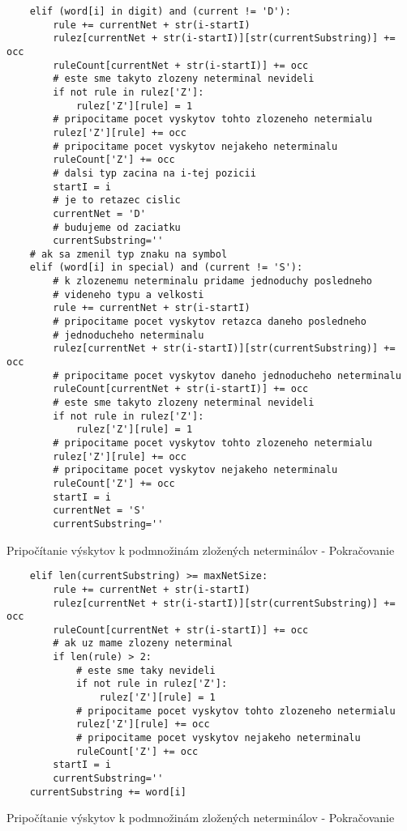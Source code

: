 \begin{listing}
\begin{verbatim}
	elif (word[i] in digit) and (current != 'D'):
		rule += currentNet + str(i-startI)
		rulez[currentNet + str(i-startI)][str(currentSubstring)] += occ
		ruleCount[currentNet + str(i-startI)] += occ
		# este sme takyto zlozeny neterminal nevideli
		if not rule in rulez['Z']:
			rulez['Z'][rule] = 1
		# pripocitame pocet vyskytov tohto zlozeneho netermialu
		rulez['Z'][rule] += occ
		# pripocitame pocet vyskytov nejakeho neterminalu
		ruleCount['Z'] += occ
		# dalsi typ zacina na i-tej pozicii
		startI = i
		# je to retazec cislic
		currentNet = 'D'
		# budujeme od zaciatku
		currentSubstring=''
	# ak sa zmenil typ znaku na symbol
	elif (word[i] in special) and (current != 'S'):
		# k zlozenemu neterminalu pridame jednoduchy posledneho
		# videneho typu a velkosti
		rule += currentNet + str(i-startI)
		# pripocitame pocet vyskytov retazca daneho posledneho
		# jednoducheho neterminalu
		rulez[currentNet + str(i-startI)][str(currentSubstring)] += occ
		# pripocitame pocet vyskytov daneho jednoducheho neterminalu
		ruleCount[currentNet + str(i-startI)] += occ
		# este sme takyto zlozeny neterminal nevideli
		if not rule in rulez['Z']:
			rulez['Z'][rule] = 1
		# pripocitame pocet vyskytov tohto zlozeneho netermialu
		rulez['Z'][rule] += occ
		# pripocitame pocet vyskytov nejakeho neterminalu
		ruleCount['Z'] += occ
		startI = i
		currentNet = 'S'
		currentSubstring=''
\end{verbatim}
\caption{Pripočítanie výskytov k podmnožinám zložených neterminálov - Pokračovanie}
\label{lst:grammar2-2}
\end{listing}
\begin{listing}
\begin{verbatim}
	elif len(currentSubstring) >= maxNetSize:
		rule += currentNet + str(i-startI)
		rulez[currentNet + str(i-startI)][str(currentSubstring)] += occ
		ruleCount[currentNet + str(i-startI)] += occ
		# ak uz mame zlozeny neterminal
		if len(rule) > 2:
			# este sme taky nevideli
			if not rule in rulez['Z']:
				rulez['Z'][rule] = 1
			# pripocitame pocet vyskytov tohto zlozeneho netermialu
			rulez['Z'][rule] += occ
			# pripocitame pocet vyskytov nejakeho neterminalu
			ruleCount['Z'] += occ
		startI = i
		currentSubstring=''
	currentSubstring += word[i]
\end{verbatim}
\caption{Pripočítanie výskytov k podmnožinám zložených neterminálov - Pokračovanie}
\label{lst:grammar2-3}
\end{listing}

